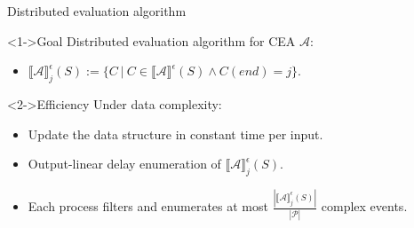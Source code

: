 \documentclass[xcolor=pdftex,dvipsnames,table]{beamer}
\begin{document}
\begin{frame}{Distributed evaluation algorithm}
  \begin{block}<1->{Goal}
    Distributed evaluation algorithm for CEA $\mathcal{A}$:
   \begin{itemize}
     \item ${\llbracket \mathcal{A} \rrbracket}^{\epsilon}_{j}(S) := \{ C \ | \ C \in {\llbracket \mathcal{A} \rrbracket}^{\epsilon}(S) \land C(end) = j \}$.
   \end{itemize}
  \end{block}

  \begin{block}<2->{Efficiency}
     Under data complexity:
      \begin{itemize}
        \item Update the data structure in constant time per input.
        \item<3-> Output-linear delay enumeration of ${\llbracket \mathcal{A} \rrbracket}^{\epsilon}_{j}(S)$.
        \pause
        \item<4-> Each process filters and enumerates at most $\frac{|{\llbracket \mathcal{A} \rrbracket}^{\epsilon}_{j}(S)|}{|\mathcal{P}|}$ complex events.
      \end{itemize}
  \end{block}
\end{frame}





\end{document}
